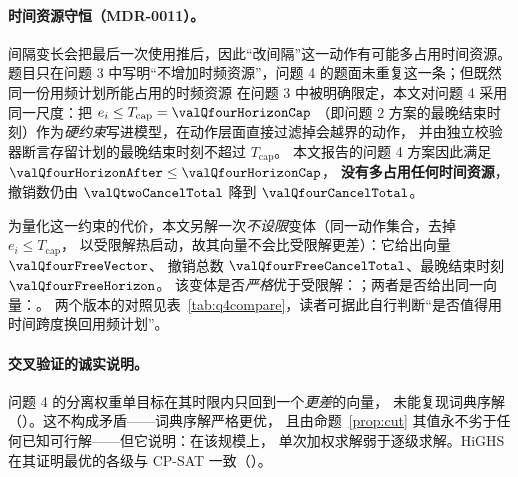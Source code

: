 \paragraph{时间资源守恒（MDR-0011）。}间隔变长会把最后一次使用推后，因此“改间隔”这一动作有可能多占用时间资源。
题目只在问题 3 中写明“不增加时频资源”，问题 4 的题面未重复这一条；但既然同一份用频计划所能占用的时频资源
在问题 3 中被明确限定，本文对问题 4 采用同一尺度：把 $e_i\le T_{\mathrm{cap}}=\valQfourHorizonCap$
（即问题 2 方案的最晚结束时刻）作为\emph{硬约束}写进模型，在动作层面直接过滤掉会越界的动作，
并由独立校验器断言存留计划的最晚结束时刻不超过 $T_{\mathrm{cap}}$。
本文报告的问题 4 方案因此满足 $\valQfourHorizonAfter\le\valQfourHorizonCap$，
\textbf{没有多占用任何时间资源}，撤销数仍由 $\valQtwoCancelTotal$ 降到 $\valQfourCancelTotal$。

为量化这一约束的代价，本文另解一次\emph{不设限}变体（同一动作集合，去掉 $e_i\le T_{\mathrm{cap}}$，
以受限解热启动，故其向量不会比受限解更差）：它给出向量 $\valQfourFreeVector$、
撤销总数 $\valQfourFreeCancelTotal$、最晚结束时刻 $\valQfourFreeHorizon$。
该变体是否\emph{严格}优于受限解：\valQfourFreeStrictlyBetter{}；两者是否给出同一向量：\valQfourFreeSameAsCapped{}。
两个版本的对照见表~\ref{tab:q4compare}，读者可据此自行判断“是否值得用时间跨度换回用频计划”。

\paragraph{交叉验证的诚实说明。}问题 4 的分离权重单目标在其时限内只回到一个\emph{更差}的向量，
未能复现词典序解（\valQfourWeightedAgree{}）。这不构成矛盾——词典序解严格更优，
且由命题~\ref{prop:cut} 其值永不劣于任何已知可行解——但它说明：在该规模上，
单次加权求解弱于逐级求解。HiGHS 在其证明最优的各级与 CP-SAT 一致（\valQfourHighsAgree{}）。
